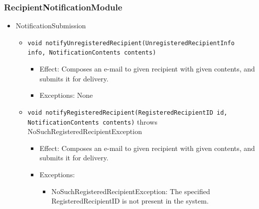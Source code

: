 \documentclass[a4paper,10pt]{article}
\begin{document}
\subsubsection*{RecipientNotificationModule}
\begin{itemize}
    \item NotificationSubmission
    \begin{itemize}
        \item \texttt{void notifyUnregisteredRecipient(UnregisteredRecipientInfo info, NotificationContents contents)}
        \begin{itemize}
            \item Effect: Composes an e-mail to given recipient with given contents, and submits it for delivery.
            \item Exceptions: None
        \end{itemize}

        \item \texttt{void notifyRegisteredRecipient(RegisteredRecipientID id, NotificationContents contents)} throws NoSuchRegisteredRecipientException
        \begin{itemize}
            \item Effect: Composes an e-mail to given recipient with given contents, and submits it for delivery.
            \item Exceptions:
            \begin{itemize}
                \item NoSuchRegisteredRecipientException: The specified RegisteredRecipientID is not present in the system.
            \end{itemize}
        \end{itemize}
    \end{itemize}
\end{itemize}
\end{document}
